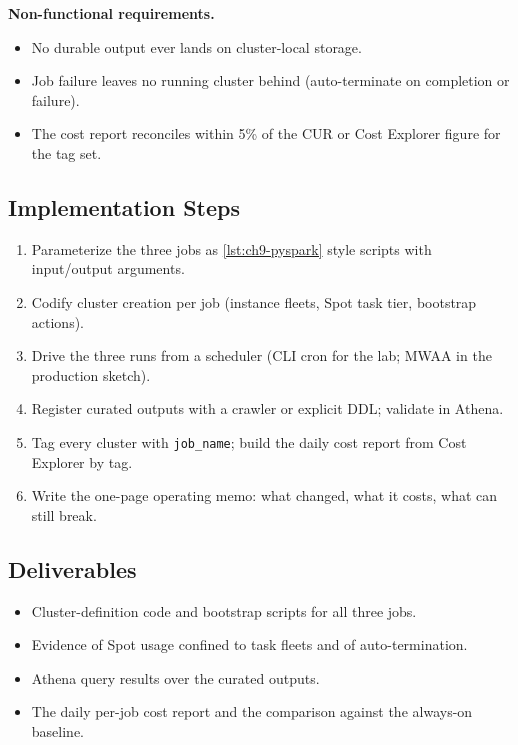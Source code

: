 \textbf{Non-functional requirements.}
\begin{itemize}
    \item No durable output ever lands on cluster-local storage.
    \item Job failure leaves no running cluster behind (auto-terminate on completion or failure).
    \item The cost report reconciles within 5\% of the CUR or Cost Explorer figure for the tag set.
\end{itemize}

\subsection*{Implementation Steps}
\begin{enumerate}
    \item Parameterize the three jobs as \cref{lst:ch9-pyspark} style scripts with input/output arguments.
    \item Codify cluster creation per job (instance fleets, Spot task tier, bootstrap actions).
    \item Drive the three runs from a scheduler (CLI cron for the lab; MWAA in the production sketch).
    \item Register curated outputs with a crawler or explicit DDL; validate in Athena.
    \item Tag every cluster with \texttt{job\_name}; build the daily cost report from Cost Explorer by tag.
    \item Write the one-page operating memo: what changed, what it costs, what can still break.
\end{enumerate}

\subsection*{Deliverables}
\begin{itemize}
    \item Cluster-definition code and bootstrap scripts for all three jobs.
    \item Evidence of Spot usage confined to task fleets and of auto-termination.
    \item Athena query results over the curated outputs.
    \item The daily per-job cost report and the comparison against the always-on baseline.
\end{itemize}

